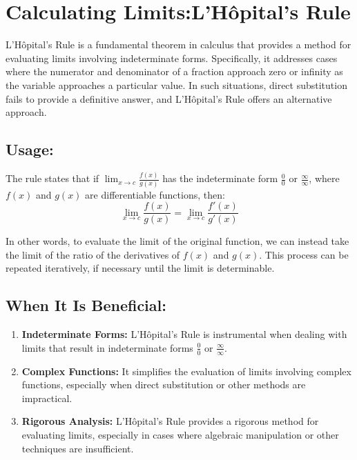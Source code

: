 \section{Calculating Limits:L'Hôpital's Rule}


L'Hôpital's Rule is a fundamental theorem in calculus that provides a method for evaluating limits involving indeterminate forms. Specifically, it addresses cases where the numerator and denominator of a fraction approach zero or infinity as the variable approaches a particular value. In such situations, direct substitution fails to provide a definitive answer, and L'Hôpital's Rule offers an alternative approach.

\subsection*{Usage:}

The rule states that if \( \lim_{x \to c} \frac{f(x)}{g(x)} \) has the indeterminate form \( \frac{0}{0} \) or \( \frac{\infty}{\infty} \), where \( f(x) \) and \( g(x) \) are differentiable functions, then:
\[ \lim_{x \to c} \frac{f(x)}{g(x)} = \lim_{x \to c} \frac{f'(x)}{g'(x)} \]

In other words, to evaluate the limit of the original function, we can instead take the limit of the ratio of the derivatives of \( f(x) \) and \( g(x) \). This process can be repeated iteratively, if necessary until the limit is determinable.

\subsection*{When It Is Beneficial:}

\begin{enumerate}
    \item \textbf{Indeterminate Forms:} L'Hôpital's Rule is instrumental when dealing with limits that result in indeterminate forms \( \frac{0}{0} \) or \( \frac{\infty}{\infty} \).
   
    \item \textbf{Complex Functions:} It simplifies the evaluation of limits involving complex functions, especially when direct substitution or other methods are impractical.
    
    \item \textbf{Rigorous Analysis:} L'Hôpital's Rule provides a rigorous method for evaluating limits, especially in cases where algebraic manipulation or other techniques are insufficient.
\end{enumerate}

